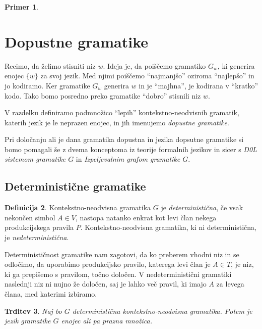 \documentclass{amsart}
\theoremstyle{definition}
\newtheorem{definicija}{Definicija}[section]
\newtheorem{primer}[definicija]{Primer}
\theoremstyle{plain} %
\newtheorem{trditev}[definicija]{Trditev}
\begin{document}
\begin{primer}
    
\end{primer}

\section{Dopustne gramatike}

Recimo, da želimo stisniti niz $ w $. Ideja je, da poiščemo gramatiko $ G_w $, ki generira
enojec $ \{ w \} $ za svoj jezik. Med njimi poiščemo ``najmanjšo'' oziroma ``najlepšo'' in jo kodiramo.
Ker gramatike $ G_w $ generira $ w $ in je ``majhna'', je kodirana v ``kratko'' kodo.
Tako bomo posredno preko gramatike ``dobro'' stisnili niz $ w $.

V razdelku definiramo podmnožico ``lepih'' kontekstno-neodvisnih gramatik, katerih jezik je le
neprazen enojec, in jih imenujemo \textit{dopustne gramatike}.

Pri določanju ali je dana gramatika dopustna in jezika dopsutne gramatike si bomo pomagali še z dvema konceptoma iz
teorije formalnih jezikov in sicer s \textit{D0L sistemom gramatike $G$} in \textit{Izpeljevalnim grafom gramatike $G$}.


\subsection*{Deterministične gramatike}

\begin{definicija}
    
    Kontekstno-neodvisna gramatika $G$ je \textit{deterministična}, če vsak nekončen simbol $ A \in V $,
    nastopa natanko enkrat kot levi član nekega produkcijskega pravila $ P $.
    Kontekstno-neodvisna gramatika, ki ni deterministična, je \textit{nedeterministična}.

\end{definicija}

Determinističnost gramatike nam zagotovi, da ko preberem vhodni niz in se odločimo, da uporabimo produkcijsko 
pravilo, katerega levi član je $ A \in T $, je niz, ki ga prepišemo s pravilom, točno določen.
V nedeterministični gramatiki naslednji niz ni nujno že določen, saj je lahko več pravil, ki imajo $ A $ za levega člana, med 
katerimi izbiramo.

\begin{trditev}

    Naj bo $G$ deterministična kontekstno-neodvisna gramatika. Potem je jezik gramatike $G$ enojec ali pa prazna množica.

\end{trditev}
\end{document}
